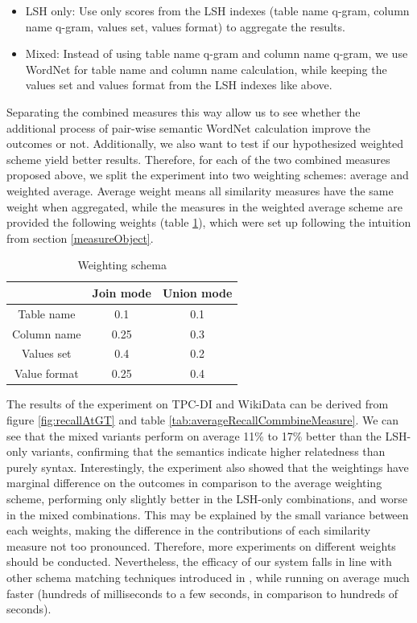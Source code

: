 \begin{itemize}
    \item LSH only: Use only scores from the LSH indexes (table name q-gram, column name q-gram, values set, values format) to aggregate the results.
    \item Mixed: Instead of using table name q-gram and column name q-gram, we use WordNet for table name and column name calculation, while keeping the values set and values format from the LSH indexes like above.
\end{itemize}

Separating the combined measures this way allow us to see whether the additional process of pair-wise semantic WordNet calculation improve the outcomes or not. Additionally, we also want to test if our hypothesized weighted scheme yield better results. Therefore, for each of the two combined measures proposed above, we split the experiment into two weighting schemes: average and weighted average. Average weight means all similarity measures have the same weight when aggregated, while the measures in the weighted average scheme are provided the following weights (table \ref{tab:weights}), which were set up following the intuition from section \ref{measureObject}.

\begin{table}[ht]
    \centering
    \begin{tabular}{|c|c|c|}
         \hline
         & Join mode & Union mode \\
         \hline
         Table name & 0.1 & 0.1\\
         Column name & 0.25 & 0.3 \\
         Values set & 0.4 & 0.2 \\
         Value format & 0.25 & 0.4 \\
         \hline
    \end{tabular}
    \caption{Weighting schema}
    \label{tab:weights}
\end{table}

The results of the experiment on TPC-DI and WikiData can be derived from figure \ref{fig:recallAtGT} and table \ref{tab:averageRecallCommbineMeasure}. We can see that the mixed variants perform on average 11\% to 17\% better than the LSH-only variants, confirming that the semantics indicate higher relatedness than purely syntax. Interestingly, the experiment also showed that the weightings have marginal difference on the outcomes in comparison to the average weighting scheme, performing only slightly better in the LSH-only combinations, and worse in the mixed combinations. This may be explained by the small variance between each weights, making the difference in the contributions of each similarity measure not too pronounced. Therefore, more experiments on different weights should be conducted. Nevertheless, the efficacy of our system falls in line with other schema matching techniques introduced in \cite{valentine}, while running on average much faster (hundreds of milliseconds to a few seconds, in comparison to hundreds of seconds).

